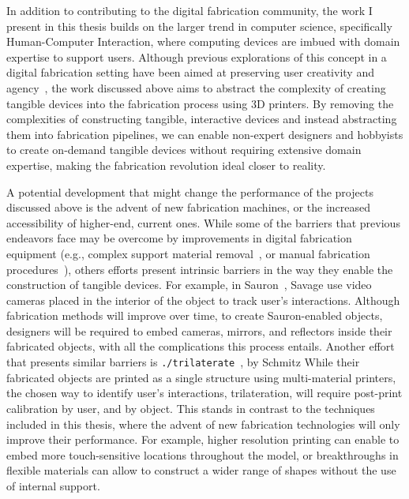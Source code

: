     In addition to contributing to the digital fabrication community, the work I
    present in this thesis builds on the larger trend in computer science,
    specifically Human-Computer Interaction, where computing devices are imbued
    with domain expertise to support users. Although previous explorations of
    this concept in a digital fabrication setting have been aimed at preserving
    user creativity and agency~\cite{Zoran:2013}, the work discussed above aims
    to abstract the complexity of creating tangible devices into the fabrication
    process using 3D printers. By removing the complexities of constructing
    tangible, interactive devices and instead abstracting them into 
    fabrication pipelines, we can enable non-expert designers and hobbyists to
    create on-demand tangible devices without requiring extensive domain
    expertise, making the fabrication revolution ideal closer to reality.

    A potential development that might change the performance of the projects
    discussed above is the advent of new fabrication machines, or the increased
    accessibility of higher-end, current ones. While some of the barriers that
    previous endeavors face may be overcome by improvements in digital
    fabrication equipment (e.g., complex support material
    removal~\cite{Laput:2015}, or manual fabrication procedures~\cite{He:2017}),
    others efforts present intrinsic barriers in the way they enable the
    construction of tangible devices. For example, in Sauron~\cite{Savage:2013},
    Savage \etal use video cameras placed in the interior of the object to track
    user's interactions.  Although fabrication methods will improve over time,
    to create Sauron-enabled objects, designers will be required to embed
    cameras, mirrors, and reflectors inside their fabricated objects, with all
    the complications this process entails. Another effort that presents similar
    barriers is \texttt{./trilaterate}~\cite{Schmitz:2019}, by Schmitz \etal
    While their fabricated objects are printed as a single structure using
    multi-material printers, the chosen way to identify user's interactions,
    trilateration, will require post-print calibration by user, and by object.
    This stands in contrast to the techniques included in this thesis, where the
    advent of new fabrication technologies will only improve their performance.
    For example, higher resolution printing can enable \at to embed more
    touch-sensitive locations throughout the model, or breakthroughs in flexible
    materials can allow \mp to construct a wider range of shapes without the use
    of internal support.

